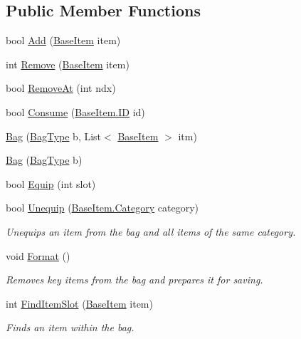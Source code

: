 \subsection*{Public Member Functions}
\begin{DoxyCompactItemize}
\item 
bool \mbox{\hyperlink{class_bag_a4efd17483fce361ea8a01dcda349b3b4}{Add}} (\mbox{\hyperlink{class_base_item}{Base\+Item}} item)
\item 
int \mbox{\hyperlink{class_bag_a42a4319aa14d0b6bda7f91070ba57a47}{Remove}} (\mbox{\hyperlink{class_base_item}{Base\+Item}} item)
\item 
bool \mbox{\hyperlink{class_bag_a2f11a414bf3edfd7f380f30b71f34104}{Remove\+At}} (int ndx)
\item 
bool \mbox{\hyperlink{class_bag_a85aa679243be4a24a6278d5f68c2ed5e}{Consume}} (\mbox{\hyperlink{class_base_item_add9920d2f5a4fa91752714a8f3ab424b}{Base\+Item.\+ID}} id)
\item 
\mbox{\hyperlink{class_bag_a3df4934de8cf1a5e5952a77160ee4ca8}{Bag}} (\mbox{\hyperlink{class_bag_a5a827c44705d57202edc93b9a39316c7}{Bag\+Type}} b, List$<$ \mbox{\hyperlink{class_base_item}{Base\+Item}} $>$ itm)
\item 
\mbox{\hyperlink{class_bag_a8d6e5dcefb12fc099b2b02347e5dacae}{Bag}} (\mbox{\hyperlink{class_bag_a5a827c44705d57202edc93b9a39316c7}{Bag\+Type}} b)
\item 
bool \mbox{\hyperlink{class_bag_a975e4ef7a5647327225e5b587b32c066}{Equip}} (int slot)
\item 
bool \mbox{\hyperlink{class_bag_aacb4579a06f66e1578327635e2120b3e}{Unequip}} (\mbox{\hyperlink{class_base_item_a882a2962396f880c2e23755437245d37}{Base\+Item.\+Category}} category)
\begin{DoxyCompactList}\small\item\em Unequips an item from the bag and all items of the same category. \end{DoxyCompactList}\item 
void \mbox{\hyperlink{class_bag_a3ee41396e25179a9c975c6f90d601bdd}{Format}} ()
\begin{DoxyCompactList}\small\item\em Removes key items from the bag and prepares it for saving. \end{DoxyCompactList}\item 
int \mbox{\hyperlink{class_bag_a0f77c6c4e4e4782d81256fa81e7d18f4}{Find\+Item\+Slot}} (\mbox{\hyperlink{class_base_item}{Base\+Item}} item)
\begin{DoxyCompactList}\small\item\em Finds an item within the bag. \end{DoxyCompactList}\item 

\end{DoxyCompactItemize}
